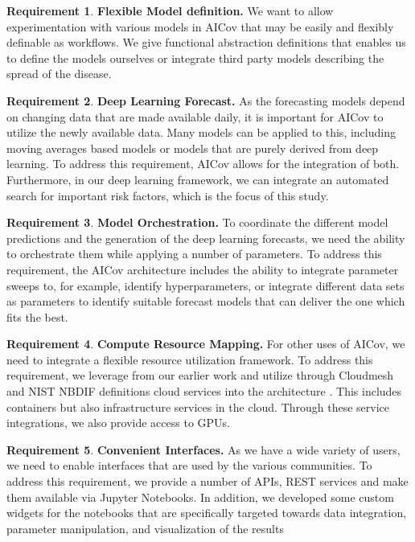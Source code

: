 \documentclass[12pt]{article}
\theoremstyle{definition}
\newtheorem{requirement}{Requirement}
\renewcommand{\_}{%
    \textunderscore\hspace{0pt}%
}
\begin{document}
\begin{requirement}{\bf Flexible Model definition.} We want to allow experimentation with various models in AICov that may be easily and flexibly definable as workflows. \Solution We give functional abstraction definitions that enables us to define the models ourselves or integrate third party models describing the spread of the disease. 
\end{requirement}

\begin{requirement}{\bf Deep Learning Forecast.} As the forecasting models depend on changing data that are made available daily, it is important for AICov to utilize the newly available data. Many models can be applied to this, including moving averages based models or models that are purely derived from deep learning. \Solution To address this requirement, AICov allows for the integration of both. Furthermore, in our deep learning framework, we can  integrate an automated search for important risk factors, which is the focus of this study.
\end{requirement}

\begin{requirement}{\bf Model Orchestration.} To coordinate the different model predictions and the generation of the deep learning forecasts, we need the ability to orchestrate them while applying a number of parameters. \Solution To address this requirement, the AICov architecture includes the ability to integrate parameter sweeps to, for example, identify hyperparameters, or integrate different data sets as parameters to identify suitable forecast models that can deliver the one which fits the best.
\end{requirement}

\begin{requirement}{\bf Compute Resource Mapping.} For other uses of AICov, we need to integrate a flexible resource utilization framework. \Solution To address this requirement, we leverage from our earlier work and utilize through Cloudmesh and NIST NBDIF definitions cloud services into the architecture \cite{las-19-nist}. This includes containers but also infrastructure services in the cloud. Through these service integrations, we also provide access to  GPUs.
\end{requirement}

\begin{requirement}{\bf Convenient Interfaces.} As we have a wide variety of users, we need to enable interfaces that are used by the various communities. \Solution To address this requirement, we provide a number of APIs, REST services and make them available via Jupyter Notebooks. In addition, we developed some custom widgets for the notebooks that are specifically targeted towards data integration, parameter manipulation, and visualization of the results 
\end{requirement}
\end{document}
